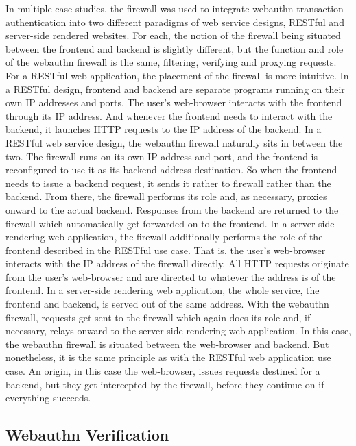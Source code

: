 In multiple case studies, the firewall was used to integrate webauthn transaction authentication into two different paradigms of web service designs, RESTful and server-side rendered websites. For each, the notion of the firewall being situated between the frontend and backend is slightly different, but the function and role of the webauthn firewall is the same, filtering, verifying and proxying requests. For a RESTful web application, the placement of the firewall is more intuitive. In a RESTful design, frontend and backend are separate programs running on their own IP addresses and ports. The user's web-browser interacts with the frontend through its IP address. And whenever the frontend needs to interact with the backend, it launches HTTP requests to the IP address of the backend. In a RESTful web service design, the webauthn firewall naturally sits in between the two. The firewall runs on its own IP address and port, and the frontend is reconfigured to use it as its backend address destination. So when the frontend needs to issue a backend request, it sends it rather to firewall rather than the backend. From there, the firewall performs its role and, as necessary, proxies onward to the actual backend. Responses from the backend are returned to the firewall which automatically get forwarded on to the frontend. In a server-side rendering web application, the firewall additionally performs the role of the frontend described in the RESTful use case. That is, the user's web-browser interacts with the IP address of the firewall directly. All HTTP requests originate from the user's web-browser and are directed to whatever the address is of the frontend. In a server-side rendering web application, the whole service, the frontend and backend, is served out of the same address. With the webauthn firewall, requests get sent to the firewall which again does its role and, if necessary, relays onward to the server-side rendering web-application. In this case, the webauthn firewall is situated between the web-browser and backend. But nonetheless, it is the same principle as with the RESTful web application use case. An origin, in this case the web-browser, issues requests destined for a backend, but they get intercepted by the firewall, before they continue on if everything succeeds.

\subsection{Webauthn Verification}


